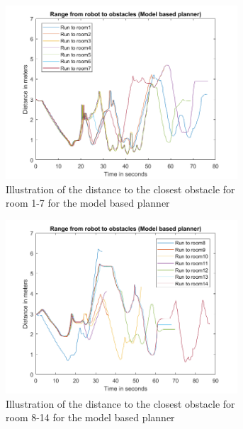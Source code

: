 \documentclass[../Head/Main.tex]{subfiles}
\begin{document}
\begin{figure}[H]
\begin{subfigure}[b]{0.49\textwidth}
    \centering
    \includegraphics[width=0.95\textwidth]{PlotModelBasedObstacle}
    \caption{Illustration of the distance to the closest obstacle for room 1-7 for the model based planner}
    \label{fig:Model1}
  \end{subfigure}
  \hfill
  \begin{subfigure}[b]{0.49\textwidth}
    \centering
    \includegraphics[width=0.95\textwidth]{Plot1ModelBasedObstacle}
    \caption{Illustration of the distance to the closest obstacle for room 8-14 for the model based planner}
    \label{fig:Model2}
  \end{subfigure}
  \hfill
  \begin{subfigure}[b]{0.99\textwidth}

\end{subfigure}
\end{figure}
\end{document}
